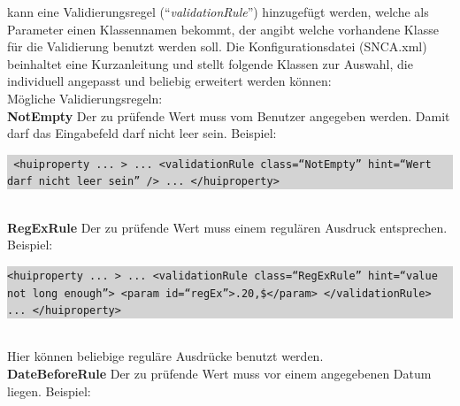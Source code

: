 \documentclass[a4paper,10pt]{book}
\begin{document}
kann eine Validierungsregel (``\textit{validationRule}'') hinzugefügt werden, welche als Parameter einen Klassennamen bekommt, der angibt welche vorhandene Klasse
für die Validierung benutzt werden soll. Die Konfigurationsdatei (SNCA.xml) beinhaltet eine Kurzanleitung
und stellt folgende Klassen zur Auswahl, die individuell angepasst und beliebig erweitert werden können:
\newline\\
Mögliche Validierungsregeln:
\newline\\
\textbf{NotEmpty}
\newline
Der zu prüfende Wert muss vom Benutzer angegeben werden. Damit darf das Eingabefeld darf nicht leer sein.
\newline
Beispiel:
\newline\\
\colorbox{lightgray}{\parbox{\textwidth}{
{\tt
<huiproperty ... > \newline
   ... \newline
   <validationRule class=``NotEmpty'' hint=``Wert darf nicht leer sein'' />\newline
   ...\newline
</huiproperty>
}
}}
\newline\\
\textbf{RegExRule}
\newline
Der zu prüfende Wert muss einem regulären Ausdruck entsprechen.
\newline
Beispiel:
\newline\\
\colorbox{lightgray}{\parbox{\textwidth}{
{\tt <huiproperty ... >\newline
   ...\newline
   <validationRule class=``RegExRule'' hint=``value not long enough''>\newline
      <param id=``regEx''>.{20,}\$</param>\newline
   </validationRule>\newline
   ...\newline
</huiproperty>}
}}
\newline\\
Hier können beliebige reguläre Ausdrücke benutzt werden.
\newline\\
\textbf{DateBeforeRule}
\newline
Der zu prüfende Wert muss vor einem angegebenen Datum liegen.
\newline
Beispiel:
\end{document}
